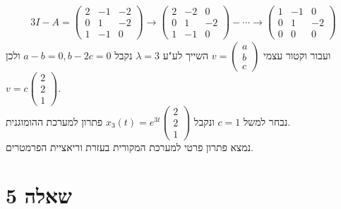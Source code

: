 \documentclass{article}
\begin{document}
\begin{align*}
    3I-A=\begin{pmatrix}
             2 & -1 & -2 \\
             0 & 1  & -2 \\
             1 & -1 & 0
         \end{pmatrix}\rightarrow \begin{pmatrix}
                                      2 & -2 & 0  \\
                                      0 & 1  & -2 \\
                                      1 & -1 & 0
                                  \end{pmatrix}-\cdots\rightarrow \begin{pmatrix}
                                                                      1 & -1 & 0  \\
                                                                      0 & 1  & -2 \\
                                                                      0 & 0  & 0
                                                                  \end{pmatrix}
\end{align*}
ועבור וקטור עצמי $v=\begin{pmatrix}
        a \\
        b \\
        c
    \end{pmatrix}$ השייך לע"ע $\lambda=3$ נקבל $a-b=0, b-2c=0$ ולכן $v=c\begin{pmatrix}
        2 \\
        2 \\
        1
    \end{pmatrix}$. \\ נבחר למשל $c=1$ ונקבל $x_3(t)=e^{3t}\begin{pmatrix}
        2 \\
        2 \\
        1
    \end{pmatrix}$ פתרון למערכת ההומוגנית.\\
נמצא פתרון פרטי למערכת המקורית בעזרת וריאציית הפרמטרים.

\pagebreak

\section*{שאלה 5}
\end{document}

